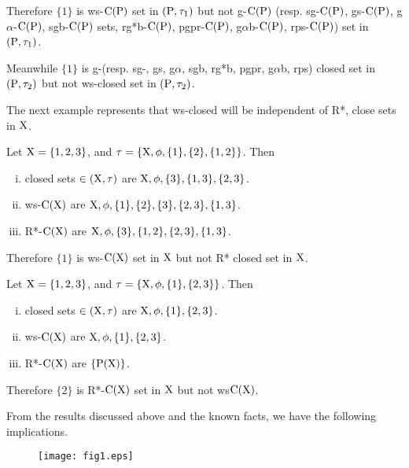 \begin{exm}
Therefore $\{1\}$ is ws-$\mathrm{C}(\mathrm{P})$ set in $(\mathrm{P}, \tau_{1})$ but not g-$\mathrm{C}(\mathrm{P})$ (resp. sg-$\mathrm{C}(\mathrm{P})$, gs-$\mathrm{C}(\mathrm{P})$, g$\alpha$-$\mathrm{C}(\mathrm{P})$, sgb-$\mathrm{C}(\mathrm{P})$ sets, rg*b-$\mathrm{C}(\mathrm{P})$, pgpr-$\mathrm{C}(\mathrm{P})$, g$\alpha$b-$\mathrm{C}(\mathrm{P})$, rps-$\mathrm{C}(\mathrm{P})$) set in $(\mathrm{P}, \tau_{1})$.

Meanwhile $\{1\}$ is g-(resp. sg-, gs, g$\alpha$, sgb, rg*b, pgpr, g$\alpha$b, rps) closed set in $(\mathrm{P}, \tau_{2})$ but not ws-closed set in $(\mathrm{P}, \tau_{2})$.
\end{exm}

\begin{rem}\label{rem2.2.20}
The next example represents that ws-closed will be independent of R*, close sets in $\mathrm{X}$.
\end{rem}

\begin{exm}\label{exm2.2.21}
Let $\mathrm{X}=\{1,2,3\}$, and $\tau=\{\mathrm{X},\phi,\{1\},\{2\},\{1,2\}\}$. Then
\begin{enumerate}[(i)]
\item closed sets $\in(\mathrm{X}, \tau)$ are $\mathrm{X}, \phi,\{3\},\{1, 3\},\{2, 3\}$.
\item ws-$\mathrm{C}(\mathrm{X})$ are $\mathrm{X}, \phi, \{1\},\{2\},\{3\},\{2, 3\}, \{1, 3\}$.
\item R*-$\mathrm{C}(\mathrm{X})$ are $\mathrm{X}, \phi,\{3\},\{1, 2\},\{2, 3\},\{1, 3\}$.
\end{enumerate}

Therefore $\{1\}$ is ws-$\mathrm{C}(\mathrm{X})$ set in $\mathrm{X}$ but not R* closed set in $\mathrm{X}$.
\end{exm}

\begin{exm}\label{add-exm2.2.21}
Let $\mathrm{X}=\{1,2,3\}$, and $\tau=\{\mathrm{X},\phi,\{1\},\{2,3\}\}$. Then
\begin{enumerate}[(i)]
\item closed sets $\in(\mathrm{X}, \tau)$ are $\mathrm{X}, \phi,\{1\},\{2, 3\}$.
\item ws-$\mathrm{C}(\mathrm{X})$ are $\mathrm{X}, \phi, \{1\},\{2, 3\}$.
\item R*-$\mathrm{C}(\mathrm{X})$ are $\{\mathrm{P}(\mathrm{X})\}$.
\end{enumerate}

Therefore $\{2\}$ is R*-$\mathrm{C}(\mathrm{X})$ set in $\mathrm{X}$ but not ws$\mathrm{C}(\mathrm{X})$.
\end{exm}

\begin{rem}\label{rem2.2.22}
From the results discussed above and the known facts, we have the following implications.

\begin{figure}[H]
\centering
\texttt{[image: fig1.eps]}
\end{figure}
\end{rem}


